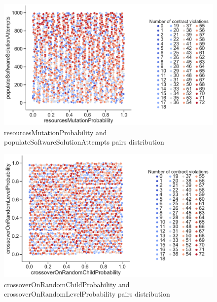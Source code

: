 \begin{figure}
	\centering
	\includegraphics[width=\textwidth]{images/PairsDistr/resourcesMutationProbability_populateSoftwareSolutionAttempts.pdf}
	\caption[resourcesMutationProbability and populateSoftwareSolutionAttempts pairs distribution]{resourcesMutationProbability and populateSoftwareSolutionAttempts pairs distribution}
	\label{fig:resourcesMutationProbability_populateSoftwareSolutionAttempts_pair}
\end{figure}
\clearpage
\begin{figure}
	\centering
	\includegraphics[width=\textwidth]{images/PairsDistr/crossoverOnRandomChildProbability_crossoverOnRandomLevelProbability.pdf}
	\caption[crossoverOnRandomChildProbability and crossoverOnRandomLevelProbability pairs distribution]{crossoverOnRandomChildProbability and crossoverOnRandomLevelProbability pairs distribution}
	\label{fig:crossoverOnRandomChildProbability_crossoverOnRandomLevelProbability_pair}
\end{figure}
\clearpage
